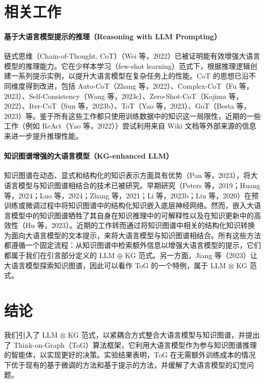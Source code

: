 \documentclass[11pt,UTF8,fontset=fandol]{ctexart}
\newcommand{\oxkg}{\ensuremath{\otimes}}
\newcommand{\opkg}{\ensuremath{\oplus}}
\begin{document}
\section{相关工作}

\paragraph{基于大语言模型提示的推理（Reasoning with LLM Prompting）}
链式思维（Chain-of-Thought, CoT）（Wei 等，2022）已被证明能有效增强大语言模型的推理能力。它在少样本学习（few-shot learning）范式下，根据推理逻辑创建一系列提示实例，以提升大语言模型在复杂任务上的性能。CoT 的思想已沿不同维度得到改进，包括 Auto-CoT（Zhang 等，2022）、Complex-CoT（Fu 等，2023）、Self-Consistency（Wang 等，2023c）、Zero-Shot-CoT（Kojima 等，2022）、Iter-CoT（Sun 等，2023b）、ToT（Yao 等，2023）、GoT（Besta 等，2023）等。鉴于所有这些工作都只使用训练数据中的知识这一局限性，近期的一些工作（例如 ReAct（Yao 等，2022））尝试利用来自 Wiki 文档等外部来源的信息来进一步提升推理性能。

\paragraph{知识图谱增强的大语言模型（KG-enhanced LLM）}
知识图谱在动态、显式和结构化的知识表示方面具有优势（Pan 等，2023），将大语言模型与知识图谱相结合的技术已被研究。早期研究（Peters 等，2019；Huang 等，2024；Luo 等，2024；Zhang 等，2021；Li 等，2023b；Liu 等，2020）在预训练或微调过程中将知识图谱中的结构化知识嵌入底层神经网络。然而，嵌入大语言模型中的知识图谱牺牲了其自身在知识推理中的可解释性以及在知识更新中的高效性（Hu 等，2023）。近期的工作转而通过将知识图谱中相关的结构化知识转换为面向大语言模型的文本提示，来将大语言模型与知识图谱相结合。所有这些方法都遵循一个固定流程：从知识图谱中检索额外信息以增强大语言模型的提示，它们都属于我们在引言部分定义的 LLM \opkg{} KG 范式。另一方面，Jiang 等（2023）让大语言模型探索知识图谱，因此可以看作 ToG 的一个特例，属于 LLM \oxkg{} KG 范式。

\section{结论}

我们引入了 LLM \oxkg{} KG 范式，以紧耦合方式整合大语言模型与知识图谱，并提出了 Think-on-Graph（ToG）算法框架，它利用大语言模型作为参与知识图谱推理的智能体，以实现更好的决策。实验结果表明，ToG 在无需额外训练成本的情况下优于现有的基于微调的方法和基于提示的方法，并缓解了大语言模型的幻觉问题。
\end{document}
